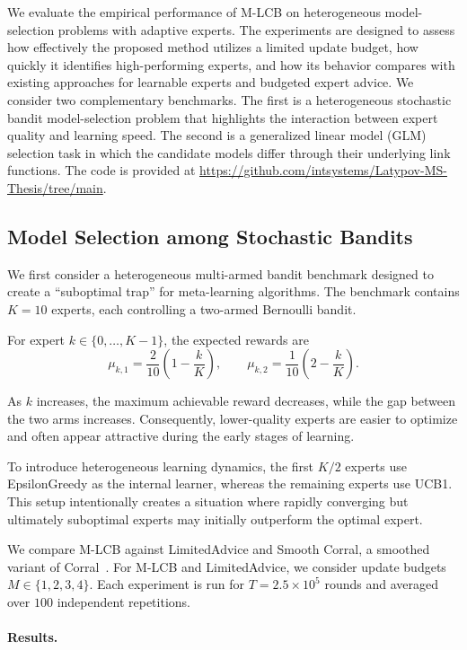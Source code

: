 \documentclass[a4paper,14pt]{extarticle}
\theoremstyle{plain}
\newcommand{\algname}[1]{{\textsf  #1}}
\begin{document}
We evaluate the empirical performance of \algname{M-LCB} on heterogeneous model-selection problems with adaptive experts. The experiments are designed to assess how effectively the proposed method utilizes a limited update budget, how quickly it identifies high-performing experts, and how its behavior compares with existing approaches for learnable experts and budgeted expert advice. We consider two complementary benchmarks. The first is a heterogeneous stochastic bandit model-selection problem that highlights the interaction between expert quality and learning speed. The second is a generalized linear model (GLM) selection task in which the candidate models differ through their underlying link functions. The code is provided at \url{https://github.com/intsystems/Latypov-MS-Thesis/tree/main}.

\subsection{Model Selection among Stochastic Bandits}
\label{sec:exp-bandits}
We first consider a heterogeneous multi-armed bandit benchmark designed to create a ``suboptimal trap'' for meta-learning algorithms. The benchmark contains $K=10$ experts, each controlling a two-armed Bernoulli bandit.

For expert $k\in\{0,\ldots,K-1\}$, the expected rewards are
\[
\mu_{k,1} = \frac{2}{10} \left( 1-\frac{k}{K} \right),
\qquad
\mu_{k,2} = \frac{1}{10} \left( 2-\frac{k}{K} \right).
\]

As $k$ increases, the maximum achievable reward decreases, while the gap between the two arms increases.
Consequently, lower-quality experts are easier to optimize and often appear attractive during the early stages of learning.

To introduce heterogeneous learning dynamics, the first $K/2$ experts use \algname{EpsilonGreedy} as the internal learner, whereas the remaining experts use \algname{UCB1}. This setup intentionally creates a situation where rapidly converging
but ultimately suboptimal experts may initially outperform the optimal expert.

We compare \algname{M-LCB} against \algname{LimitedAdvice} and Smooth Corral, a smoothed variant of
\algname{Corral}~\cite{agarwal2017corralling}. For \algname{M-LCB} and \algname{LimitedAdvice}, we consider update budgets $M\in\{1,2,3,4\}$. Each experiment is run for $T = 2.5\times10^5$ rounds and averaged over $100$ independent repetitions.

\paragraph{Results.}
\end{document}
